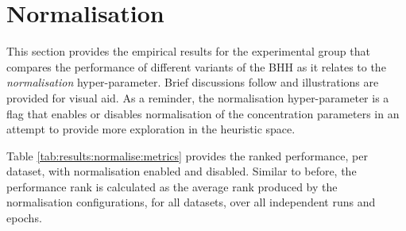 \section{Normalisation}\label{sec:results:normalise}

This section provides the empirical results for the experimental group that compares the performance of different variants of the \acs{BHH} as it relates to the \textit{normalisation} hyper-parameter. Brief discussions follow and illustrations are provided for visual aid. As a reminder, the normalisation hyper-parameter is a flag that enables or disables normalisation of the concentration parameters in an attempt to provide more exploration in the heuristic space.

Table \ref{tab:results:normalise:metrics} provides the ranked performance, per dataset, with normalisation enabled and disabled. Similar to before, the performance rank is calculated as the average rank produced by the normalisation configurations, for all datasets, over all independent runs and epochs.

